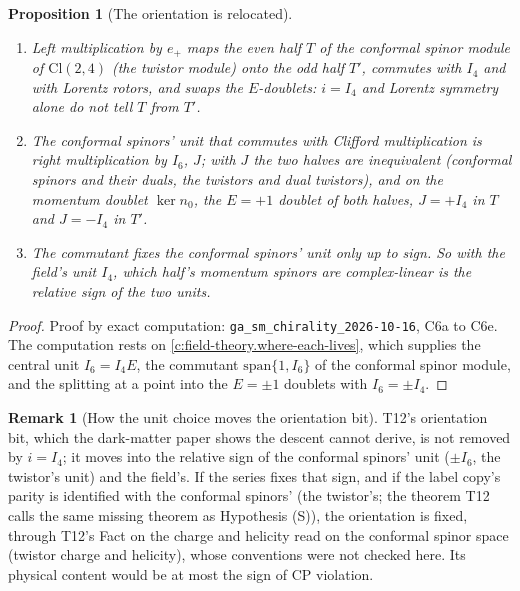 \documentclass[11pt]{article}
\newtheorem{proposition}[theorem]{Proposition}
\theoremstyle{definition}
\newtheorem{remark}[theorem]{Remark}
\theoremstyle{plain}
\providecommand{\Cl}{}\renewcommand{\Cl}{\mathrm{Cl}}
\begin{document}
\begin{proposition}[The orientation is relocated]\label{c:field-theory.orientation-relocated}
\begin{enumerate}
\item Left multiplication by $e_+$ maps the even half $T$ of the conformal spinor module of $\Cl(2,4)$ (the twistor module) onto the odd half $T'$, commutes with $I_4$ and with Lorentz rotors, and swaps the $E$-doublets: $i = I_4$ and Lorentz symmetry alone do not tell $T$ from $T'$.
\item The conformal spinors' unit that commutes with Clifford multiplication is right multiplication by $I_6$, $J$; with $J$ the two halves are inequivalent (conformal spinors and their duals, the twistors and dual twistors), and on the momentum doublet $\ker n_0$, the $E = +1$ doublet of both halves, $J = +I_4$ in $T$ and $J = -I_4$ in $T'$.
\item The commutant fixes the conformal spinors' unit only up to sign. So with the field's unit $I_4$, which half's momentum spinors are complex-linear is the relative sign of the two units.
\end{enumerate}
\end{proposition}
\begin{proof}
Proof by exact computation: \texttt{ga\_sm\_chirality\_2026-10-16}, C6a to C6e. The computation rests on \ref{c:field-theory.where-each-lives}, which supplies the central unit $I_6 = I_4E$, the commutant $\mathrm{span}\{1, I_6\}$ of the conformal spinor module, and the splitting at a point into the $E = \pm 1$ doublets with $I_6 = \pm I_4$.

\end{proof}

\begin{remark}[How the unit choice moves the orientation bit]\label{c:note.field-theory.what-does-t12}
T12's orientation bit, which the dark-matter paper shows the descent cannot derive, is not removed by $i = I_4$; it moves into the relative sign of the conformal spinors' unit ($\pm I_6$, the twistor's unit) and the field's. If the series fixes that sign, and if the label copy's parity is identified with the conformal spinors' (the twistor's; the theorem T12 calls the same missing theorem as Hypothesis (S)), the orientation is fixed, through T12's Fact on the charge and helicity read on the conformal spinor space (twistor charge and helicity), whose conventions were not checked here. Its physical content would be at most the sign of CP violation.
\end{remark}
\end{document}

